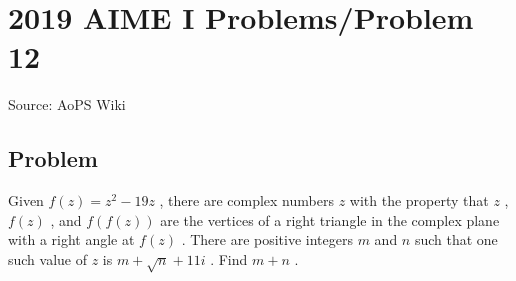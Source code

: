 \documentclass[12pt]{article}
\begin{document}
\section*{{2019 AIME I Problems/Problem 12}}
Source: AoPS Wiki

\subsection*{Problem}
Given $f(z) = z^2-19z$ , there are complex numbers $z$ with the property that $z$ , $f(z)$ , and $f(f(z))$ are the vertices of a right triangle in the complex plane with a right angle at $f(z)$ . There are positive integers $m$ and $n$ such that one such value of $z$ is $m+\sqrt{n}+11i$ . Find $m+n$ .
\end{document}
